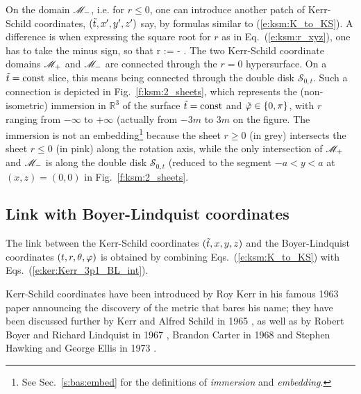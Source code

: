 On the domain $\mathscr{M}_-$, i.e. for $r\leq 0$,
one can introduce another patch of Kerr-Schild coordinates, $({\tilde t},x',y',z')$ say,
by formulas similar to (\ref{e:ksm:K_to_KS}). A difference is when expressing
the square root for $r$ as in Eq.~(\ref{e:ksm:r_xyz}), one has to take the
minus sign, so that
\be
    r := -  .
\ee
The two Kerr-Schild coordinate domains $\mathscr{M}_+$ and $\mathscr{M}_-$ are connected through
the $r=0$ hypersurface. On a ${\tilde t}=\mathrm{const}$ slice, this means being
connected through the double disk $\mathcal{S}_{0,t}$. Such a connection
is depicted in Fig.~\ref{f:ksm:2_sheets}, which represents the (non-isometric)
immersion in $\mathbb{R}^3$ of the surface ${\tilde t}=\mathrm{const}$ and ${\tilde\varphi}\in\{0,\pi\}$,
with $r$ ranging from $-\infty$ to $+\infty$ (actually from $-3m$ to $3m$
on the figure. The immersion is not an embedding\footnote{See Sec.~\ref{s:bas:embed}
for the definitions of \emph{immersion} and \emph{embedding}.} because the
sheet $r\geq 0$ (in grey) intersects the sheet $r\leq 0$ (in pink) along the
rotation axis, while the only intersection of $\mathscr{M}_+$ and $\mathscr{M}_-$ is along
the double disk $\mathcal{S}_{0,t}$ (reduced to the segment $-a < y< a$ at
$(x,z) = (0,0)$ in Fig.~\ref{f:ksm:2_sheets}.


\subsection{Link with Boyer-Lindquist coordinates}

The link between the Kerr-Schild coordinates $({\tilde t},x,y,z)$ and the Boyer-Lindquist
coordinates $(t,r,\theta,\varphi)$
is obtained by combining Eqs.~(\ref{e:ksm:K_to_KS}) with Eqs.~(\ref{e:ker:Kerr_3p1_BL_int}).


\begin{hist}
Kerr-Schild coordinates have been introduced by Roy Kerr in his famous 1963 paper
\cite{Kerr63} announcing the discovery of the
metric that bares his name; they have been discussed further by Kerr and Alfred
Schild
in 1965 \cite{KerrS65}, as well as by
Robert Boyer and Richard Lindquist
in 1967 \cite{BoyerL67}, Brandon Carter in 1968
\cite{Carte68}
and Stephen Hawking and George Ellis in 1973 \cite{HawkiE73}.
\end{hist}

